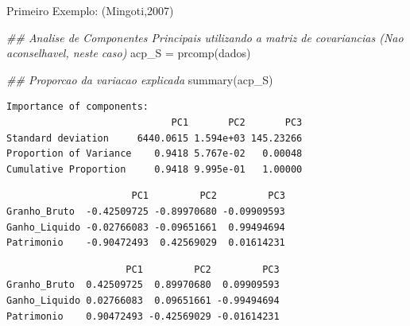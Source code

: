 \documentclass[
  ignorenonframetext,
  aspectratio=169,
]{beamer}
\newenvironment{Shaded}{\begin{snugshade}}{\end{snugshade}}
\newcommand{\DocumentationTok}[1]{\textcolor[rgb]{0.37,0.37,0.37}{\textit{#1}}}
\newcommand{\FunctionTok}[1]{\textcolor[rgb]{0.28,0.35,0.67}{#1}}
\newcommand{\NormalTok}[1]{\textcolor[rgb]{0.00,0.23,0.31}{#1}}
\newcommand{\OtherTok}[1]{\textcolor[rgb]{0.00,0.23,0.31}{#1}}
\newcommand{\SpecialCharTok}[1]{\textcolor[rgb]{0.37,0.37,0.37}{#1}}
\begin{document}
\begin{frame}[fragile]{Primeiro Exemplo: (Mingoti,2007)}
\label{primeiro-exemplo-mingoti2007-3}
\begin{Shaded}
\begin{Highlighting}[]
\DocumentationTok{\#\# Analise de Componentes Principais utilizando a matriz de covariancias (Nao aconselhavel, neste caso)}
\NormalTok{acp\_S }\OtherTok{=} \FunctionTok{prcomp}\NormalTok{(dados)}

\DocumentationTok{\#\# Proporcao da variacao explicada}
\FunctionTok{summary}\NormalTok{(acp\_S)}
\end{Highlighting}
\end{Shaded}

\begin{verbatim}
Importance of components:
                             PC1       PC2       PC3
Standard deviation     6440.0615 1.594e+03 145.23266
Proportion of Variance    0.9418 5.767e-02   0.00048
Cumulative Proportion     0.9418 9.995e-01   1.00000
\end{verbatim}

\begin{Shaded}
\end{Shaded}

\begin{verbatim}
                      PC1         PC2         PC3
Granho_Bruto  -0.42509725 -0.89970680 -0.09909593
Ganho_Liquido -0.02766083 -0.09651661  0.99494694
Patrimonio    -0.90472493  0.42569029  0.01614231
\end{verbatim}

\begin{Shaded}
\end{Shaded}

\begin{verbatim}
                     PC1         PC2         PC3
Granho_Bruto  0.42509725  0.89970680  0.09909593
Ganho_Liquido 0.02766083  0.09651661 -0.99494694
Patrimonio    0.90472493 -0.42569029 -0.01614231
\end{verbatim}
\end{frame}
\end{document}
